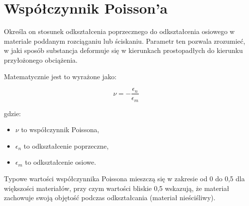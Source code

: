 {}
\justify
\fontsize{14}{16}\selectfont
\setlength{\parindent}{0pt}
\section*{Współczynnik Poisson'a \cite{alma991001031769708832}} 
\label{chap:wstep}
\fontsize{12}{14}\selectfont
\vspace{\baselineskip} 

Określa on stosunek odkształcenia poprzecznego do odkształcenia osiowego w materiale poddanym rozciąganiu lub ściskaniu. Parametr ten pozwala zrozumieć, w jaki sposób substancja deformuje się w kierunkach prostopadłych do kierunku przyłożonego obciążenia.

Matematycznie jest to wyrażone jako:

$$
\nu = -\frac{\epsilon_n}{\epsilon_m}
$$

gdzie:
\begin{itemize}
    \item $\nu$ to współczynnik Poissona,
    \item $\epsilon_n$ to odkształcenie poprzeczne,
    \item $\epsilon_m$ to odkształcenie osiowe.
\end{itemize}

Typowe wartości współczynnika Poissona mieszczą się w zakresie od 0 do 0,5 dla większości materiałów, przy czym wartości bliskie 0,5 wskazują, że materiał zachowuje swoją objętość podczas odkształcania (materiał nieściśliwy).